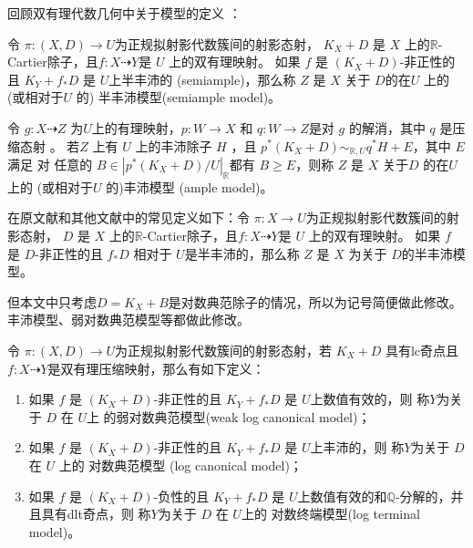 回顾双有理代数几何中关于模型的定义 \cite{BCHM10}：
\begin{definition}
  \cite[Definition 3.6.5]{BCHM10} 令 $ \pi:(X,D)\to U $为正规拟射影代数簇间的射影态射， $K_{X}+D$ 是 $X$ 上的$\mathbb{R}$-Cartier除子，且$ f: X\dashrightarrow Y $是 $U$ 上的双有理映射。  如果 $ f $ 是 $ (K_X+D) $-非正性的且 $ K_Y+f_*D $ 是 $ U $上半丰沛的 (semiample)，那么称 $Z$ 是 $X$ 关于 $D$的在$U$ 上的 (或相对于$U$ 的) 半丰沛模型(semiample model)。

  令 $ g:X\dashrightarrow Z $ 为$ U $上的有理映射，$p:W \to X $ 和 $q:W \to Z $是对 $g$ 的解消，其中 $q$ 是压缩态射 。 若$Z$ 上有 $U$ 上的丰沛除子 $H$ ，且 $p^*(K_{X}+D) \sim_{\mathbb{R},U} q^*H+E$，其中 $E$  满足    对 任意的 $B \in |p^*(K_{X}+D)/U|_{\mathbb{R}}$都有 $B\geqslant E$，则称 $Z$ 是 $X$ 关于$D$ 的在$U$ 上的 (或相对于$U$ 的)丰沛模型 (ample model)。
\end{definition}

\begin{remark}
  在原文献和其他文献中的常见定义如下：令 $ \pi:X\to U $为正规拟射影代数簇间的射影态射， $D$ 是 $X$ 上的$\mathbb{R}$-Cartier除子，且$ f: X\dashrightarrow Y $是 $U$ 上的双有理映射。  如果 $ f $ 是 $ D $-非正性的且 $ f_*D $ 相对于 $ U $是半丰沛的，那么称 $Z$ 是 $X$ 为关于 $D$的半丰沛模型。

  但本文中只考虑$D=K_{X}+B$是对数典范除子的情况，所以为记号简便做此修改。丰沛模型、弱对数典范模型等都做此修改。
\end{remark}
\begin{definition}\label{models}
  \cite[Definition 3.6.7]{BCHM10} 令 $ \pi:(X,D)\to U $为正规拟射影代数簇间的射影态射，若 $ K_X+D $ 具有lc奇点且$ f:X\dashrightarrow Y $是双有理压缩映射，那么有如下定义：
  \begin{enumerate}
    \item 如果 $f$ 是  $ (K_X+D) $-非正性的且 $ K_Y+f_*D $ 是 $ U $上数值有效的，则  称$ Y $为关于 $D$ 在 $U$上 的弱对数典范模型(weak log canonical model)；
    \item 如果 $f$ 是  $ (K_X+D) $-非正性的且 $ K_Y+f_*D $ 是 $ U $上丰沛的，则  称$ Y $为关于 $D$ 在 $U$ 上的  对数典范模型 (log canonical model)；
    \item 如果 $f$ 是  $ (K_X+D) $-负性的且 $ K_Y+f_*D $ 是 $ U $上数值有效的和$\mathbb{Q}$-分解的，并且具有dlt奇点，则  称$ Y $为关于 $D$ 在 $U$上的  对数终端模型(log terminal model)。
  \end{enumerate}
\end{definition}

